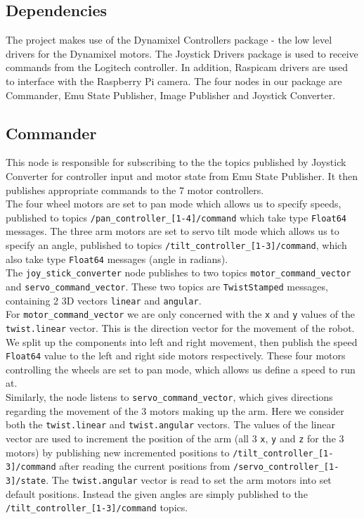\documentclass[titlepage,12pt,a4paper]{article}
\begin{document}
\subsection{Dependencies}

\noindent The project makes use of the Dynamixel Controllers package - the low level drivers for the Dynamixel motors. The Joystick Drivers package is used to receive commands from the Logitech controller. In addition, Raspicam drivers are used to interface with the Raspberry Pi camera.
The four nodes in our package are Commander, Emu State Publisher, Image Publisher and Joystick Converter.

\subsection{Commander}
This node is responsible for subscribing to the the topics published by Joystick Converter for controller input and motor state from Emu State Publisher. It then publishes appropriate commands to the 7 motor controllers.\\

\noindent The four wheel motors are set to pan mode which allows us to specify speeds, published to topics \texttt{/pan\_controller\_[1-4]/command} which take type \texttt{Float64} messages. The three arm motors are set to servo tilt mode which allows us to specify an angle, published to topics \texttt{/tilt\_controller\_[1-3]/command}, which also take type \texttt{Float64} messages (angle in radians).\\

\noindent The \texttt{joy\_stick\_converter} node publishes to two topics \texttt{motor\_command\_vector} and \texttt{servo\_command\_vector}. These two topics are \texttt{TwistStamped} messages, containing 2 3D vectors \texttt{linear} and \texttt{angular}.\\

\noindent For \texttt{motor\_command\_vector} we are only concerned with the \texttt{x} and \texttt{y} values of the \texttt{twist.linear} vector. This is the direction vector for the movement of the robot. We split up the components into left and right movement, then publish the speed \texttt{Float64} value to the left and right side motors respectively. These four motors controlling the wheels are set to pan mode, which allows us define a speed to run at.\\

\noindent Similarly, the node listens to \texttt{servo\_command\_vector}, which gives directions regarding the movement of the 3 motors making up the arm. Here we consider both the \texttt{twist.linear} and \texttt{twist.angular} vectors. The values of the linear vector are used to increment the position of the arm (all 3 \texttt{x}, \texttt{y} and \texttt{z} for the 3 motors) by publishing new incremented positions to \texttt{/tilt\_controller\_[1-3]/command} after reading the current positions from \texttt{/servo\_controller\_[1-3]/state}. The \texttt{twist.angular} vector is read to set the arm motors into set default positions. Instead the given angles are simply published to the \texttt{/tilt\_controller\_[1-3]/command} topics. \\
\end{document}
